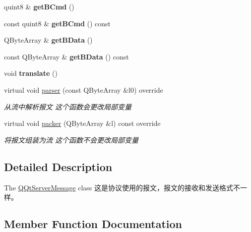 \begin{DoxyCompactItemize}
quint8 \& {\bfseries get\+B\+Cmd} ()
\item 
\mbox{\label{class_q_qt_server_message_a89aa5428122407e19cb39a132fca6863}} 
const quint8 \& {\bfseries get\+B\+Cmd} () const
\item 
\mbox{\label{class_q_qt_server_message_ac64679c515a152b1fdf3d9d19dfa4e75}} 
Q\+Byte\+Array \& {\bfseries get\+B\+Data} ()
\item 
\mbox{\label{class_q_qt_server_message_ae5602c6036cae79c2f84f7d33c162f78}} 
const Q\+Byte\+Array \& {\bfseries get\+B\+Data} () const
\item 
\mbox{\label{class_q_qt_server_message_acbf4ba197e1840e35013fecbdc4ae614}} 
void {\bfseries translate} ()
\item 
virtual void \mbox{\hyperlink{class_q_qt_server_message_a4f1ed5558eab8c286d61bfc224b0b7a7}{parser}} (const Q\+Byte\+Array \&l0) override
\begin{DoxyCompactList}\small\item\em 从流中解析报文 这个函数会更改局部变量 \end{DoxyCompactList}\item 
virtual void \mbox{\hyperlink{class_q_qt_server_message_a34603726fc449dbb5cd8d8a2fd891160}{packer}} (Q\+Byte\+Array \&l) const override
\begin{DoxyCompactList}\small\item\em 将报文组装为流 这个函数不会更改局部变量 \end{DoxyCompactList}\end{DoxyCompactItemize}


\subsection{Detailed Description}
The \mbox{\hyperlink{class_q_qt_server_message}{Q\+Qt\+Server\+Message}} class 这是协议使用的报文，报文的接收和发送格式不一样。 

\subsection{Member Function Documentation}
\mbox{\label{class_q_qt_server_message_a34603726fc449dbb5cd8d8a2fd891160}} 
